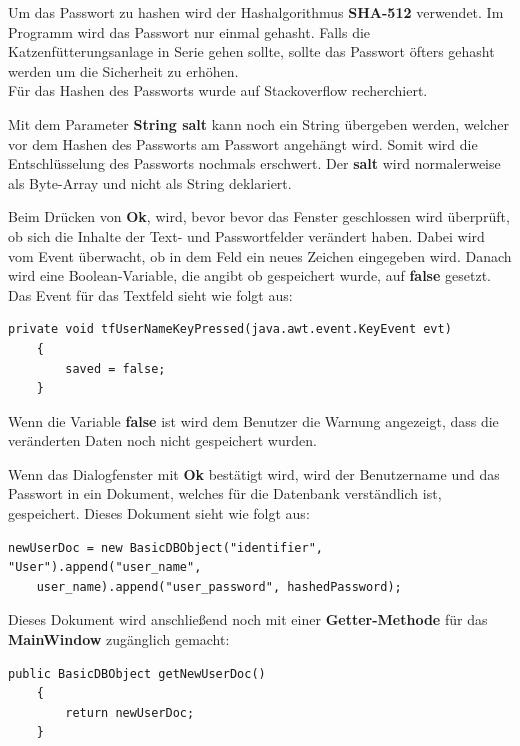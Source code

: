 Um das Passwort zu hashen wird der Hashalgorithmus \textbf{SHA-512} verwendet. Im Programm wird das Passwort nur einmal gehasht. Falls die Katzenfütterungsanlage in Serie gehen sollte, sollte das Passwort öfters gehasht werden um die Sicherheit zu erhöhen.
\\ Für das Hashen des Passworts wurde auf Stackoverflow  recherchiert.

Mit dem Parameter \textbf{String salt} kann noch ein String übergeben werden, welcher vor dem Hashen des Passworts am Passwort angehängt wird. Somit wird die Entschlüsselung des Passworts nochmals erschwert. Der  \textbf{salt} wird normalerweise als Byte-Array und nicht als String deklariert.

\vspace{10pt}

Beim Drücken von \textbf{Ok}, wird, bevor bevor das Fenster geschlossen wird überprüft, ob sich die Inhalte der Text- und Passwortfelder verändert haben. Dabei wird vom Event überwacht, ob in dem Feld ein neues Zeichen eingegeben wird. Danach wird eine Boolean-Variable, die angibt ob gespeichert wurde, auf \textbf{false} gesetzt. Das Event für das Textfeld sieht wie folgt aus:
\begin{lstlisting}[style=Javastyle, caption=Textfeld Event]
	private void tfUserNameKeyPressed(java.awt.event.KeyEvent evt)                                       
	{                                           
		saved = false;
	}
\end{lstlisting}
Wenn die Variable \textbf{false} ist wird dem Benutzer die Warnung angezeigt, dass die veränderten Daten noch nicht gespeichert wurden.

\vspace{10pt}

Wenn das Dialogfenster mit \textbf{Ok} bestätigt wird, wird der Benutzername und das Passwort in ein Dokument, welches für die Datenbank verständlich ist, gespeichert. Dieses Dokument sieht wie folgt aus:
\begin{lstlisting}[style=Javastyle, caption=Benutzerdokument]
newUserDoc = new BasicDBObject("identifier", "User").append("user_name", 
	user_name).append("user_password", hashedPassword);
\end{lstlisting}

Dieses Dokument wird anschließend noch mit einer \textbf{Getter-Methode} für das  \textbf{MainWindow} zugänglich gemacht:
\begin{lstlisting}[style=Javastyle, caption=Benutzerdokument Getter-Methode]
	public BasicDBObject getNewUserDoc()
	{
		return newUserDoc;
	}
\end{lstlisting}

